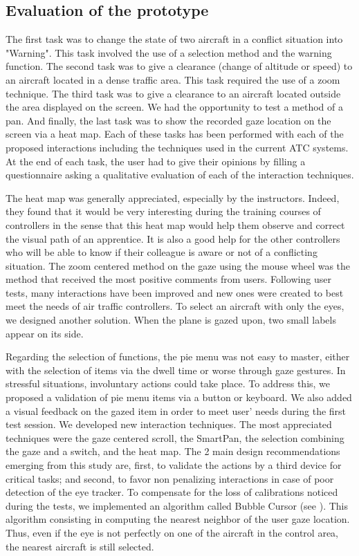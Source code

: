 \subsection{Evaluation of the prototype}
The first task was to change the state of two aircraft in a
conflict situation into "Warning". This task involved the use
of a selection method and the warning function. The second
task was to give a clearance (change of altitude or speed) to
an aircraft located in a dense traffic area. This task required
the use of a zoom technique. The third task was to give a
clearance to an aircraft located outside the area displayed on
the screen. We had the opportunity to test a method of a pan.
And finally, the last task was to show the recorded gaze
location on the screen via a heat map.
Each of these tasks has been performed with each of the
proposed interactions including the techniques used in the
current ATC systems. At the end of each task, the user had
to give their opinions by filling a questionnaire asking a
qualitative evaluation of each of the interaction techniques.

The heat map was generally appreciated, especially by the
instructors. Indeed, they found that it would be very
interesting during the training courses of controllers in the
sense that this heat map would help them observe and
correct the visual path of an apprentice. It is also a good help
for the other controllers who will be able to know if their
colleague is aware or not of a conflicting situation. The
zoom centered method on the gaze using the mouse wheel
was the method that received the most positive comments
from users.
Following user tests, many interactions have been improved
and new ones were created to best meet the needs of air
traffic controllers. To select an aircraft with only the eyes,
we designed another solution. When the plane is gazed upon, two
small labels appear on its side.

Regarding the selection of functions, the pie menu was not
easy to master, either with the selection of items via the
dwell time or worse through gaze gestures. In stressful
situations, involuntary actions could take place. To address
this, we proposed a validation of pie menu items via a button
or keyboard. We also added a visual feedback on the gazed
item in order to meet user' needs during the first test
session.
We developed new interaction techniques. The most appreciated
techniques were the gaze centered scroll, the SmartPan, the
selection combining the gaze and a switch, and the heat
map. The 2 main design recommendations emerging from
this study are, first, to validate the actions by a third device for critical tasks; and second, to favor non penalizing
interactions in case of poor detection of the eye tracker. To compensate for the loss of calibrations noticed during the
tests, we implemented an algorithm called Bubble Cursor  (see
\cite{Grossman:2005:BCE:1054972.1055012}). This algorithm consisting in computing the nearest
neighbor of the user gaze location. Thus, even if the eye is
not perfectly on one of the aircraft in the control area, the
nearest aircraft is still selected.



